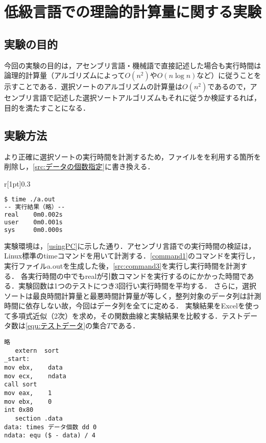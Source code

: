 \chapter{低級言語での理論的計算量に関する実験}\label{chap:時間計測}
\section{実験の目的}
今回の実験の目的は，アセンブリ言語・機械語で直接記述した場合も実行時間は論理的計算量（アルゴリズムによって\(O(n^2)\)や\(O(n\log n)\)など）に従うことを示すことである．選択ソートのアルゴリズムの計算量は\(O(n^2)\)である\cite[p.50,51]{アルゴリズムとデータ構造}ので，アセンブリ言語で記述した選択ソートアルゴリズムもそれに従うか検証するれば，目的を満たすことになる．
\section{実験方法}\label{sec:時間計測}
より正確に選択ソートの実行時間を計測するため，\testsort ファイルを\print を利用する箇所を削除し，\ref{src:データの個数指定}に書き換える．\par
\begin{wrapfigure}{r}[1pt]{0.3\textwidth}
   \vspace{-3em}
   \begin{lstlisting}[language={Bash},caption={時間計測実行コマンド},label={src:command3},frame={single},numbers={none}]
$ time ./a.out
-- 実行結果（略）--
real    0m0.002s
user    0m0.001s
sys     0m0.000s
\end{lstlisting}
   \vspace{-3em}
\end{wrapfigure}
実験環境は，\ref{usingPC}に示した通り．アセンブリ言語での実行時間の検証は，Linux標準の{\ttfamily time}コマンドを用いて計測する．\ref{command1}のコマンドを実行し，実行ファイル{\ttfamily a.out}を生成した後，\ref{src:command3}を実行し実行時間を計測する．
各実行時間の中でも{\ttfamily real}が引数コマンドを実行するのにかかった時間である．実験回数は1つのテストにつき3回行い実行時間を平均する．
さらに，選択ソートは最良時間計算量と最悪時間計算量が等しく\cite[p.50]{アルゴリズムとデータ構造}，整列対象のデータ列は計測時間に依存しない故，今回はデータ列を全て{}に定める．
実験結果をExcelを使って多項式近似（2次）を求め，その関数曲線と実験結果を比較する．テストデータ数は\eqref{equ:テストデータ}の集合\(T\)である．\\
\begin{minipage}[c]{0.43\textwidth}
   \centering
   \hspace*{2em}
   \begin{lstlisting}[caption={\testsort 書き換え後}, label={src:データの個数指定},frame={single},numbers={none}]
略
   extern  sort
_start:
mov ebx,    data
mov ecx,    ndata
call sort
mov eax,    1
mov ebx,    0
int 0x80
   section .data
data: times データ個数 dd 0
ndata: equ ($ - data) / 4
   \end{lstlisting}
\end{minipage}
